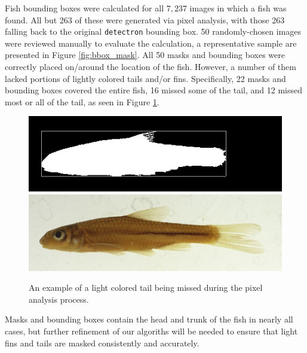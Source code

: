 \documentclass[conference]{IEEEtran}
\begin{document}
Fish bounding boxes were calculated for all \(7,237\) images in which a fish was found. All but 263 of these were generated via pixel analysis, with those 263 falling back to the original \verb|detectron| bounding box.
50 randomly-chosen images were reviewed manually to evaluate the
calculation, a representative sample are presented in
Figure \ref{fig:bbox_mask}.
All 50 masks and bounding boxes were correctly placed
on/around the location of the fish. However, a number of them lacked portions of lightly colored tails and/or fins.
Specifically, 22 masks and bounding boxes covered the entire fish,
16 missed some of the tail, and 12 missed most or all of the tail, as
seen in Figure \ref{fig:missedTail}.
\begin{figure}[H]
  \centering
  \includegraphics[width=0.49\linewidth]{images/61631}
  \includegraphics[width=0.49\linewidth]{images/61631_mask}
  \caption{An example of a light colored tail being missed during the pixel analysis process.}
  \label{fig:missedTail}
\end{figure}
Masks and bounding boxes contain the head and trunk of the fish in nearly all cases, but further refinement of our algoriths will be needed
to ensure that light fins and tails are masked consistently and accurately.
\end{document}
